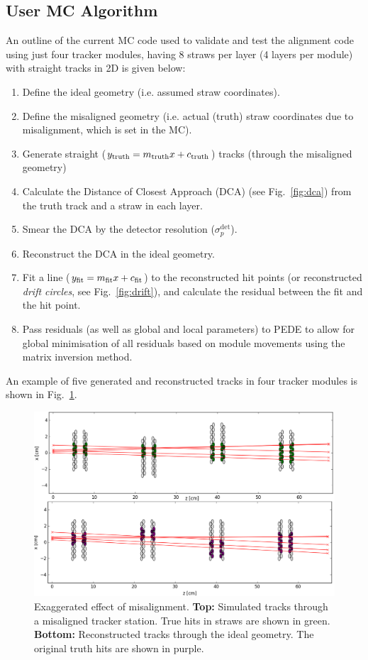 \documentclass[a4paper,11pt]{article}
\begin{document}
\subsection{User MC Algorithm}
\vspace{-0.1cm}
An outline of the current MC code used to validate and test the alignment code using just four tracker modules, having 8 straws per layer (4 layers per module) with straight tracks in 2D is given below:
\vspace{-0.4cm}
\begin{enumerate}
	\setlength\itemsep{-0.5em}
	\item Define the ideal geometry (i.e. assumed straw coordinates).
	\item Define the misaligned geometry (i.e. actual (truth) straw coordinates due to misalignment, which is set in the MC).
	\item Generate straight ($y_{\rm{truth}} = m_{\rm{truth}}x+c_{\rm{truth}}$) tracks (through the misaligned geometry) 
	\item Calculate the Distance of Closest Approach (DCA) (see Fig.~\ref{fig:dca}) from the truth track and a straw in each layer.
	\item Smear the DCA by the detector resolution ($\sigma_p^{\mathrm{det}}$).
	\item Reconstruct the DCA in the ideal geometry.
	\item Fit a line ($y_{\rm{fit}} = m_{\rm{fit}}x+c_{\rm{fit}}$) to the reconstructed hit points (or reconstructed \textit{drift circles}, see Fig.~\ref{fig:drift}), and calculate the residual between the fit and the hit point.
	\item Pass residuals (as well as global and local parameters) to PEDE to allow for global minimisation of all residuals based on module movements using the matrix inversion method.
\end{enumerate}
\vspace{-0.1cm}
An example of five generated and reconstructed tracks in four tracker modules is shown in Fig.~\ref{fig:tracks}.
\clearpage
\begin{figure}[!ht]
	\centering
	\includegraphics[scale = 0.43]{fig/tracks.png}
	\caption{Exaggerated effect of misalignment. \textbf{Top:} Simulated tracks through a misaligned tracker station. True hits in straws are shown in green. \textbf{Bottom:} Reconstructed tracks through the ideal geometry. The original truth hits are shown in purple.}
	\label{fig:tracks}
\end{figure}
\end{document}
